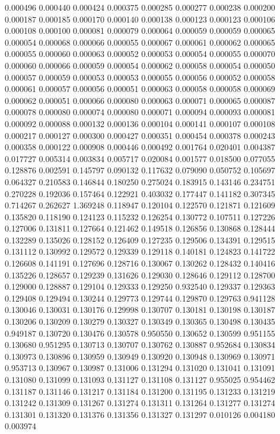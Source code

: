 0.000496
0.000440
0.000424
0.000375
0.000285
0.000277
0.000238
0.000200
0.000187
0.000185
0.000170
0.000140
0.000138
0.000123
0.000123
0.000106
0.000108
0.000100
0.000081
0.000079
0.000064
0.000059
0.000059
0.000065
0.000054
0.000068
0.000066
0.000055
0.000067
0.000061
0.000062
0.000065
0.000055
0.000060
0.000063
0.000052
0.000053
0.000054
0.000055
0.000070
0.000060
0.000066
0.000059
0.000054
0.000062
0.000058
0.000054
0.000050
0.000057
0.000059
0.000053
0.000053
0.000055
0.000056
0.000052
0.000058
0.000061
0.000057
0.000056
0.000051
0.000063
0.000058
0.000058
0.000069
0.000062
0.000051
0.000066
0.000080
0.000063
0.000071
0.000065
0.000087
0.000078
0.000080
0.000074
0.000080
0.000071
0.000094
0.000093
0.000081
0.000092
0.000088
0.000132
0.000136
0.000104
0.000141
0.000107
0.000108
0.000217
0.000127
0.000300
0.000427
0.000351
0.000454
0.000378
0.000243
0.000358
0.000122
0.000908
0.000446
0.000492
0.001764
0.020401
0.004387
0.017727
0.005314
0.003834
0.005717
0.020084
0.001577
0.018500
0.077055
0.128876
0.002591
0.145797
0.090132
0.117632
0.079090
0.050752
0.105697
0.064327
0.210583
0.146844
0.180250
0.275024
0.183915
0.143146
0.234751
0.270228
0.192036
0.157464
0.122921
0.403032
0.177447
0.141182
0.307345
0.714267
0.262627
1.369248
0.118947
0.120104
0.122570
0.121871
0.121609
0.135820
0.118190
0.124123
0.115232
0.126254
0.130772
0.107511
0.127226
0.127006
0.131811
0.127664
0.121462
0.149518
0.126856
0.130868
0.128444
0.132289
0.135026
0.128152
0.126409
0.127235
0.129506
0.134391
0.129515
0.131112
0.130992
0.129572
0.129339
0.129118
0.140181
0.124823
0.141722
0.126608
0.141191
0.127696
0.128716
0.130067
0.130262
0.128432
0.140416
0.135226
0.128657
0.129239
0.131626
0.129030
0.128646
0.129112
0.128700
0.129000
0.128887
0.129104
0.129333
0.129250
0.932540
0.129337
0.129363
0.129408
0.129494
0.130244
0.129773
0.129744
0.129870
0.129763
0.941128
0.130046
0.130031
0.130176
0.129998
0.130707
0.130181
0.130198
0.130187
0.130206
0.130209
0.130279
0.130327
0.130349
0.130365
0.130498
0.130435
0.949187
0.130720
0.130476
0.130578
0.950550
0.130652
0.130599
0.951155
0.130680
0.951295
0.130713
0.130707
0.130762
0.130887
0.952684
0.130834
0.130973
0.130896
0.130959
0.130949
0.130920
0.130948
0.130969
0.130971
0.953713
0.130967
0.130987
0.131006
0.131294
0.131020
0.131041
0.131091
0.131080
0.131099
0.131093
0.131127
0.131108
0.131127
0.955025
0.954462
0.131187
0.131146
0.131217
0.131184
0.131200
0.131195
0.131233
0.131219
0.131242
0.131309
0.131267
0.131274
0.131311
0.131264
0.131277
0.131274
0.131301
0.131320
0.131376
0.131356
0.131327
0.131297
0.010126
0.004180
0.003974
